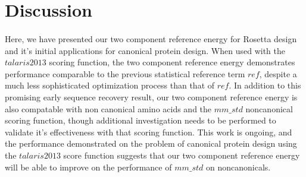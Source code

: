 \section{Discussion}

\paragraph{}
Here, we have presented our two component reference energy for Rosetta design and it's initial applications for canonical protein design.
When used with the $talaris2013$ scoring function, the two component reference energy demonstrates performance comparable to the previous statistical reference term $ref$, despite a much less sophisticated optimization process than that of $ref$\cite{leaver-fay_chapter_2013}.
In addition to this promising early sequence recovery result, our two component reference energy is also compatable with non canonical amino acids and the $mm\_std$ noncanonical scoring function, though additional investigation needs to be performed to validate it's effectiveness with that scoring function.
This work is ongoing, and the performance demonstrated on the problem of canonical protein design using the $talaris2013$ score function suggests that our two component reference energy will be able to improve on the performance of $mm\_std$ on noncanonicals.

